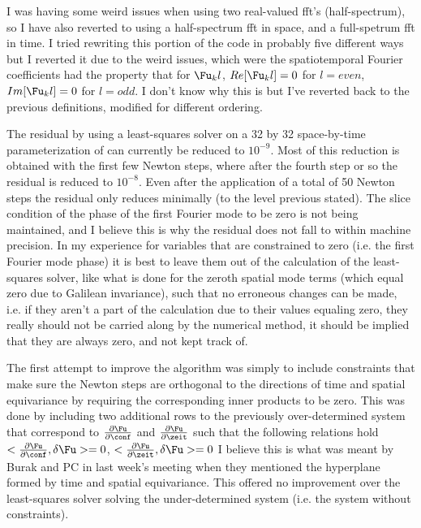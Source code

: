 I was having some weird issues when using two real-valued fft's (half-spectrum), so I have also
reverted to using a half-spectrum fft in space, and a full-spetrum fft in time. I tried rewriting
this portion of the code in probably five different ways but I reverted it due to the weird issues,
which were the spatiotemporal Fourier coefficients had the property that for $\Fu_kl$,
$Re[\Fu_kl] = 0$ for $l= even$, $Im[\Fu_kl] = 0$ for $l=odd$. I don't know why this is but I've reverted
back to the previous definitions, modified for different ordering.

The residual by using a least-squares solver on a 32 by 32 space-by-time parameterization of 
can currently be reduced to $10^{-9}$. Most of this reduction is obtained with the first few Newton steps,
where after the fourth step or so the residual is reduced to $10^{-8}$. Even after the application of a total
of 50 Newton steps the residual only reduces minimally (to the level previous stated). The slice condition
of the phase of the first Fourier mode to be zero is not being maintained, and I believe this is why the
residual does not fall to within machine precision. In my experience for variables that are constrained to
zero (i.e. the first Fourier mode phase) it is best to leave them out of the calculation of the least-squares
solver, like what is done for the zeroth spatial mode terms (which equal zero due to Galilean invariance), such
that no erroneous changes can be made, i.e. if they aren't a part of the calculation due to their values equaling
zero, they really should not be carried along by the numerical method, it should be implied that they are always zero,
and not kept track of.

The first attempt to improve the algorithm was simply to include constraints that make sure the Newton steps
are orthogonal to the directions of time and spatial equivariance by requiring the corresponding
inner products to be zero. This was done by including two additional rows to the previously over-determined
system that correspond to $\frac{\partial \Fu}{\partial \conf}$ and $\frac{\partial \Fu}{\partial \zeit}$
such that the following relations hold $<\frac{\partial \Fu}{\partial \conf},\delta \Fu >=0$, $<\frac{\partial \Fu}{\partial \zeit},\delta \Fu >=0$
I believe this is what was meant by Burak and PC in last week's meeting when they mentioned the hyperplane formed
by time and spatial equivariance. This offered no improvement over the least-squares solver solving the under-determined
system (i.e. the system without constraints).

